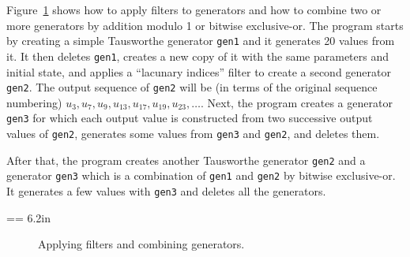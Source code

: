 
Figure~\ref{fig:prog-filter} shows how to apply filters to generators
and how to combine two or more generators by addition modulo 1 or bitwise
exclusive-or.
The program starts by creating a simple Tausworthe generator {\tt gen1}
and it generates 20 values from it.
It then deletes {\tt gen1}, creates a new copy of it with the same 
parameters and initial state, and applies a ``lacunary indices'' 
filter to create a second generator {\tt gen2}.  
The output sequence of {\tt gen2} will be 
(in terms of the original sequence numbering)
$u_3, u_7, u_9, u_{13}, u_{17}, u_{19}, u_{23}, \dots$.
Next, the program creates a generator {\tt gen3} for which each output value
is constructed from two successive output values of {\tt gen2},
generates some values from {\tt gen3} and {\tt gen2}, and deletes them.
%

After that, the program creates another Tausworthe generator {\tt gen2}
and a generator {\tt gen3} which is a combination of {\tt gen1} and 
{\tt gen2} by bitwise exclusive-or.  It generates a few values with
{\tt gen3} and deletes all the generators.



=\vbox {\hsize = 6.2in
{\smallc
}
}

\begin{figure} \centering {}
\caption{Applying filters and combining generators.}
\label{fig:prog-filter}
\end{figure}


